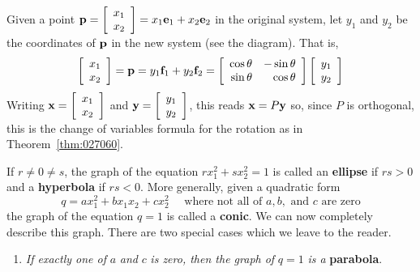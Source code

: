 Given a point $\textbf{p} = \left[ \begin{array}{c}
x_{1} \\
x_{2}
\end{array}\right] = x_{1}\textbf{e}_{1}  + x_{2}\textbf{e}_{2}$
 in the original system, let $y_{1}$ and $y_{2}$ be the coordinates of $\textbf{p}$ in the new system (see the diagram). That is,
\begin{equation}\label{rotationEq2}
\left[ \begin{array}{c}
x_{1} \\
x_{2}
\end{array}\right] = \textbf{p} = y_{1}\textbf{f}_{1} + y_{2}\textbf{f}_{2} = \left[ \begin{array}{rr}
\cos\theta & -\sin\theta \\
\sin\theta & \cos\theta
\end{array}\right] \left[ \begin{array}{c}
y_{1} \\
y_{2}
\end{array}\right]
\end{equation}
Writing $\textbf{x} = \left[ \begin{array}{c}
x_{1} \\
x_{2}
\end{array}\right]$
and $\textbf{y} = \left[ \begin{array}{c}
y_{1} \\
y_{2}
\end{array}\right]$, this reads $\textbf{x} = P\textbf{y}$ so, since $P$ is orthogonal, this is the change of variables formula for the rotation as in Theorem~\ref{thm:027060}.

If $r \neq 0 \neq s$, the graph of the equation $rx_{1}^2 + sx_{2}^2 = 1$ is called an \textbf{ellipse} if $rs > 0$ and a \textbf{hyperbola} if $rs < 0$. More generally, given a quadratic form
\begin{equation*}
q = ax_{1}^2 + bx_{1}x_{2} + cx_{2}^2 \quad \mbox{ where not all of } a, b, \mbox{ and } c \mbox{ are zero}
\end{equation*}
the graph of the equation $q = 1$ is called a \textbf{conic}. We can now completely describe this graph. There are two special cases which we leave to the reader.


\begin{enumerate}
\item \textit{If exactly one of} $a$ \textit{and} $c$ \textit{is zero, then the graph of} $q = 1$ \textit{is a} \textbf{parabola}.

\end{enumerate}


